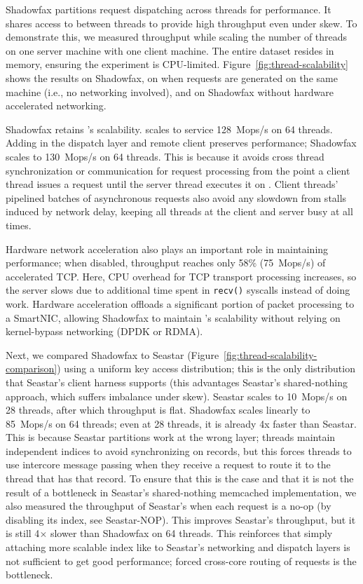 Shadowfax partitions request dispatching across threads for
performance.
%
It shares access to \faster between threads to provide high
throughput even under skew.
%
To demonstrate this, we measured throughput while scaling the number of threads
on one server machine with one client machine.
%
The entire dataset resides in memory, ensuring the experiment is CPU-limited.
%
Figure~\ref{fig:thread-scalability} shows the results on Shadowfax, on
\faster when requests are generated on the same machine (i.e., no networking involved), and on Shadowfax without
hardware accelerated networking.

%
Shadowfax retains \faster{}'s scalability.
%
\faster{} scales to service 128~Mops/s on 64 threads.
%
Adding in the dispatch layer and remote client preserves performance;
Shadowfax scales to 130~Mops/s on 64 threads.
%
This is because it avoids cross thread synchronization or communication for
request processing from the point a client thread issues a request until the
server thread executes it on \faster.
%
Client threads' pipelined batches of asynchronous requests also avoid any
slowdown from stalls induced by network delay, keeping all threads at the
client and server busy at all times.

Hardware network acceleration also plays an important role in
maintaining performance; when disabled, throughput reaches only 58\%
(75~Mops/s) of
accelerated TCP.
%
Here, CPU overhead for TCP transport processing increases, so the server
slows due to additional time spent in \texttt{recv()} syscalls instead of doing
work.
%
Hardware acceleration offloads a significant portion of packet processing to a
SmartNIC, allowing Shadowfax to maintain \faster{}'s scalability without
relying on kernel-bypass networking (DPDK or RDMA).

Next, we compared Shadowfax to Seastar
(Figure~\ref{fig:thread-scalability-comparison}) using a uniform key access
distribution; this is the only distribution that Seastar's client harness
supports (this advantages Seastar's shared-nothing approach, which suffers
imbalance under skew).
%
Seastar scales to 10~Mops/s on 28 threads, after which throughput is flat.
%
Shadowfax scales linearly to 85~Mops/s on 64 threads; even at 28 threads, it is
already 4x faster than Seastar.
%
This is because Seastar partitions work at the wrong layer; threads maintain
independent indices to avoid synchronizing on records, but this forces threads
to use intercore message passing when they receive a request to route it to
the thread that has that record.
%
To ensure that this is the case and that it is not the result of a bottleneck in
Seastar's shared-nothing memcached implementation, we also measured the
throughput of Seastar's when each request is a no-op (by disabling its index,
see Seastar-NOP).
%
This improves Seastar's throughput, but it is still 4$\times{}$ slower
than Shadowfax on 64 threads.
%
This reinforces that simply attaching more scalable index like
\faster to Seastar's networking and dispatch layers is not sufficient to get
good performance; forced cross-core routing of requests is the bottleneck.


